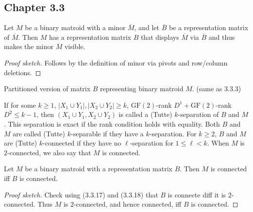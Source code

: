 \subsection{Chapter 3.3}

\begin{lemma}[3.3.12]
  \label{lem:3.3.12}
  Let $M$ be a binary matroid with a minor $\overline{M}$, and let $\overline{B}$ be a representation matrix of $\overline{M}$. Then $M$ has a representation matrix $B$ that displays $\overline{M}$ via $\overline{B}$ and thus makes the minor $\overline{M}$ visible.
\end{lemma}

\begin{proof}[Proof sketch]
  Follows by the definition of minor via pivots and row/column deletions.
\end{proof}

\begin{proposition}[3.3.17]
  \label{prop:3.3.17}
  Partitioned version of matrix $B$ representing binary matroid $M$. (same as 3.3.3)
\end{proposition}

\begin{proposition}[3.3.18] %
  \label{prop:3.3.18}
  If for some $k \geq 1$, $|X_{1} \cup Y_{1}|, |X_{2} \cup Y_{2}| \geq k$, $\mathrm{GF}(2)$-rank $D^{1} + \mathrm{GF}(2)$-rank $D^{2} \leq k - 1$, then $(X_{1} \cup Y_{1}, X_{2} \cup Y_{2})$ is called a (Tutte) $k$-separation of $B$ and $M$. This separation is exact if the rank condition holds with equality. Both $B$ and $M$ are called (Tutte) $k$-separable if they have a $k$-separation. For $k \geq 2$, $B$ and $M$ are (Tutte) $k$-connected if they have no $\ell$-separation for $1 \leq \ell < k$. When $M$ is $2$-connected, we also say that $M$ is connected.
\end{proposition}

\begin{lemma}[3.3.19]
  \label{lem:3.3.19}
  Let $M$ be a binary matroid with a representation matrix $B$. Then $M$ is connected iff $B$ is connected.
\end{lemma}

\begin{proof}[Proof sketch]
  Check using (3.3.17) and (3.3.18) that $B$ is connecte diff it is $2$-connected. Thus $M$ is $2$-connected, and hence connected, iff $B$ is connected.
\end{proof}

